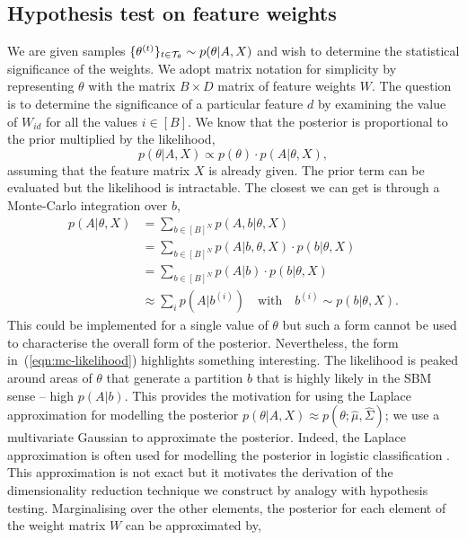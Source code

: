 \subsection{Hypothesis test on feature weights}
\label{appdx:hyp-test}

We are given samples $\{\theta^{(t)}\}_{t \in \mathcal{T}_\theta} \sim p(\theta | A, X)$ and wish to determine the statistical significance of the weights. We adopt matrix notation for simplicity by representing $\theta$ with the matrix $B \times D$ matrix of feature weights $W$. The question is to determine the significance of a particular feature $d$ by examining the value of $W_{id}$ for all the values $i \in [B]$. We know that the posterior is proportional to the prior multiplied by the likelihood,
%
\begin{equation}
	p(\theta|A, X) \propto p(\theta) \cdot p(A | \theta, X),
\end{equation}
%
assuming that the feature matrix $X$ is already given. The prior term can be evaluated but the likelihood is intractable. The closest we can get is through a Monte-Carlo integration over $b$,
%
\begin{align}
	p(A | \theta, X) &= \sum_{b \in [B]^N} p(A, b | \theta, X) \nonumber \\
	&= \sum_{b \in [B]^N} p(A | b, \theta, X) \cdot p(b | \theta, X) \nonumber \\
	&= \sum_{b \in [B]^N} p(A | b) \cdot p(b | \theta, X) \nonumber \\
	&\approx \sum_{i} p\left( A | b^{(i)} \right) \quad \textrm{with} \quad b^{(i)} \sim p(b| \theta, X).
	\label{eqn:mc-likelihood}
\end{align}
%
This could be implemented for a single value of $\theta$ but such a form cannot be used to characterise the overall form of the posterior. Nevertheless, the form in~(\ref{eqn:mc-likelihood}) highlights something interesting. The likelihood is peaked around areas of $\theta$ that generate a partition $b$ that is highly likely in the SBM sense -- high $p(A|b)$. This provides the motivation for using the Laplace approximation for modelling the posterior $p(\theta | A, X) \approx p(\theta; \hat{\mu}, \hat{\Sigma})$; we use a multivariate Gaussian to approximate the posterior. Indeed, the Laplace approximation is often used for modelling the posterior in logistic classification \cite{laplace}. This approximation is not exact but it motivates the derivation of the dimensionality reduction technique we construct by analogy with hypothesis testing. Marginalising over the other elements, the posterior for each element of the weight matrix $W$ can be approximated by,
